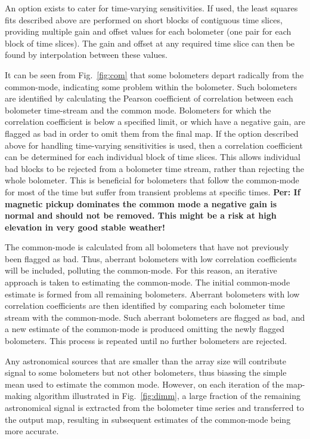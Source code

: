 \documentclass[useAMS,usenatbib,nofootinbib]{mn2e}
\begin{document}
An option exists to cater for time-varying sensitivities. If used, the
least squares fits described above are performed on short blocks of
contiguous time slices, providing multiple gain and offset values for
each bolometer (one pair for each block of time slices). The gain and
offset at any required time slice can then be found by interpolation
between these values.

It can be seen from Fig.~\ref{fig:com} that some bolometers depart
radically from the common-mode, indicating some problem within the
bolometer. Such bolometers are identified by calculating the Pearson
coefficient of correlation between each bolometer time-stream and the
common mode. Bolometers for which the correlation coefficient is below
a specified limit, or which have a negative gain, are flagged as bad
in order to omit them from the final map. If the option described
above for handling time-varying sensitivities is used, then a
correlation coefficient can be determined for each individual block of
time slices.  This allows individual bad blocks to be rejected from a
bolometer time stream, rather than rejecting the whole bolometer. This
is beneficial for bolometers that follow the common-mode for most of
the time but suffer from transient problems at specific times. {\bf
Per: If magnetic pickup dominates the common mode a negative gain is
normal and should not be removed. This might be a risk at high
elevation in very good stable weather!}

The common-mode is calculated from all bolometers that have not
previously been flagged as bad. Thus, aberrant bolometers with low
correlation coefficients will be included, polluting the common-mode. For
this reason, an iterative approach is taken to estimating the common-mode.
The initial common-mode estimate is formed from all remaining bolometers.
Aberrant bolometers with low correlation coefficients are then identified
by comparing each bolometer time stream with the common-mode. Such
aberrant bolometers are flagged as bad, and a new estimate of the
common-mode is produced omitting the newly flagged bolometers. This
process is repeated until no further bolometers are rejected.

Any astronomical sources that are smaller than the array size will
contribute signal to some bolometers but not other bolometers, thus
biassing the simple mean used to estimate the common mode. However, on
each iteration of the map-making algorithm illustrated in
Fig.~\ref{fig:dimm}, a large fraction of the remaining astronomical
signal is extracted from the bolometer time series and transferred to the
output map, resulting in subsequent estimates of the common-mode being
more accurate.
\end{document}
